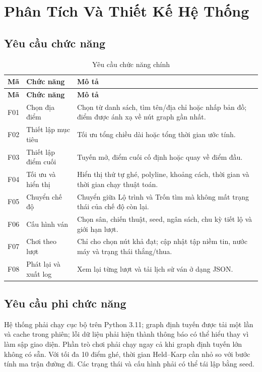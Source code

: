 \chapter{Phân Tích Và Thiết Kế Hệ Thống}

\section{Yêu cầu chức năng}

\begin{longtable}{p{1.2cm}p{5.0cm}p{8.0cm}}
\caption{Yêu cầu chức năng chính}\label{tab:functional}\\
\toprule
\textbf{Mã} & \textbf{Chức năng} & \textbf{Mô tả} \\
\midrule
\endfirsthead
\toprule
\textbf{Mã} & \textbf{Chức năng} & \textbf{Mô tả} \\
\midrule
\endhead
F01 & Chọn địa điểm & Chọn từ danh sách, tìm tên/địa chỉ hoặc nhấp bản đồ; điểm
được ánh xạ về nút graph gần nhất. \\
F02 & Thiết lập mục tiêu & Tối ưu tổng chiều dài hoặc tổng thời gian ước tính. \\
F03 & Thiết lập điểm cuối & Tuyến mở, điểm cuối cố định hoặc quay về điểm đầu. \\
F04 & Tối ưu và hiển thị & Hiển thị thứ tự ghé, polyline, khoảng cách, thời gian
và thời gian chạy thuật toán. \\
F05 & Chuyển chế độ & Chuyển giữa Lộ trình và Trốn tìm mà không mất trạng thái
của chế độ còn lại. \\
F06 & Cấu hình ván & Chọn sân, chiến thuật, seed, ngân sách, chu kỳ tiết lộ và
giới hạn lượt. \\
F07 & Chơi theo lượt & Chỉ cho chọn nút khả đạt; cập nhật tập niềm tin, nước máy
và trạng thái thắng/thua. \\
F08 & Phát lại và xuất log & Xem lại từng lượt và tải lịch sử ván ở dạng JSON. \\
\bottomrule
\end{longtable}

\section{Yêu cầu phi chức năng}

Hệ thống phải chạy cục bộ trên Python 3.11; graph định tuyến được tải một lần và
cache trong phiên; lỗi dữ liệu phải hiện thành thông báo có thể hiểu thay vì làm
sập giao diện. Phần trò chơi phải chạy ngay cả khi graph định tuyến lớn không có
sẵn. Với tối đa 10 điểm ghé, thời gian Held--Karp cần nhỏ so với bước tính ma
trận đường đi. Các trạng thái và cấu hình phải có thể tái lập bằng seed.

